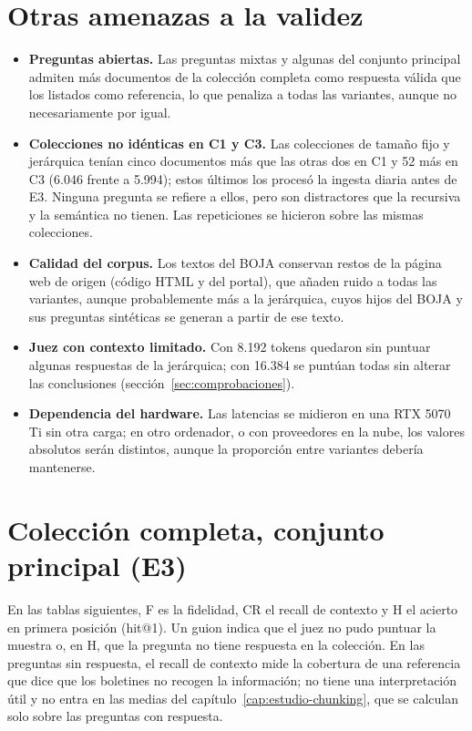 \section{Otras amenazas a la validez}
\label{sec:validez-detalle}

\begin{itemize}
  \item \textbf{Preguntas abiertas.} Las preguntas mixtas y algunas del conjunto principal admiten más documentos de la colección completa como respuesta válida que los listados como referencia, lo que penaliza a todas las variantes, aunque no necesariamente por igual.
  \item \textbf{Colecciones no idénticas en C1 y C3.} Las colecciones de tamaño fijo y jerárquica tenían cinco documentos más que las otras dos en C1 y 52 más en C3 (6.046 frente a 5.994); estos últimos los procesó la ingesta diaria antes de E3. Ninguna pregunta se refiere a ellos, pero son distractores que la recursiva y la semántica no tienen. Las repeticiones se hicieron sobre las mismas colecciones.
  \item \textbf{Calidad del corpus.} Los textos del BOJA conservan restos de la página web de origen (código HTML y del portal), que añaden ruido a todas las variantes, aunque probablemente más a la jerárquica, cuyos hijos del BOJA y sus preguntas sintéticas se generan a partir de ese texto.
  \item \textbf{Juez con contexto limitado.} Con 8.192 tokens quedaron sin puntuar algunas respuestas de la jerárquica; con 16.384 se puntúan todas sin alterar las conclusiones (sección~\ref{sec:comprobaciones}).
  \item \textbf{Dependencia del hardware.} Las latencias se midieron en una RTX 5070 Ti sin otra carga; en otro ordenador, o con proveedores en la nube, los valores absolutos serán distintos, aunque la proporción entre variantes debería mantenerse.
\end{itemize}

\section{Colección completa, conjunto principal (E3)}

En las tablas siguientes, F es la fidelidad, CR el recall de contexto y H el acierto en primera posición (hit@1). Un guion indica que el juez no pudo puntuar la muestra o, en H, que la pregunta no tiene respuesta en la colección. En las preguntas sin respuesta, el recall de contexto mide la cobertura de una referencia que dice que los boletines no recogen la información; no tiene una interpretación útil y no entra en las medias del capítulo~\ref{cap:estudio-chunking}, que se calculan solo sobre las preguntas con respuesta.

